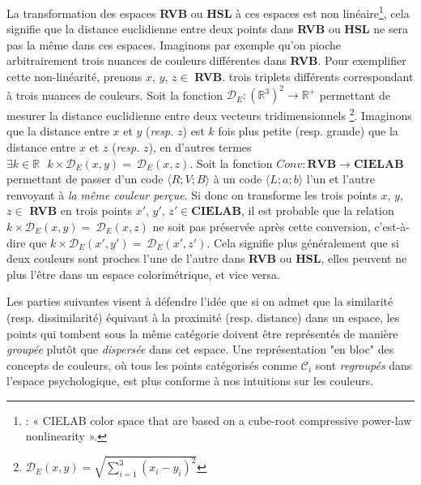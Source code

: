\documentclass{article}
\begin{document}
La transformation des espaces \textbf{RVB} ou \textbf{HSL} à ces espaces est non linéaire\footnote{\textcite[p.43]{fairchild2013}: « CIELAB color space that are based on a cube-root compressive power-law nonlinearity ».}, cela signifie que la distance euclidienne entre deux points dans \textbf{RVB} ou \textbf{HSL} ne sera pas la même dans ces espaces. Imaginons par exemple qu’on pioche arbitrairement trois nuances de couleurs différentes dans \textbf{RVB}. Pour exemplifier cette non-linéarité, prenons $x$, $y$, $z \in$ \textbf{RVB}. trois triplets différents correspondant à trois nuances de couleurs.  Soit la fonction \(\mathcal{D}_E\colon\left(\mathbb{R}^3\right)^2\rightarrow\mathbb{R}^+\) permettant de mesurer la distance euclidienne entre deux vecteurs tridimensionnels \footnote{$\mathcal{D}_E(x,y)=\sqrt{\sum_{i=1}^{3}\left(x_i - y_i \right)^2}$}. Imaginons que la distance entre $x$ et $y$ (\textit{resp.} $z$) est $k$ fois plus petite (resp. grande) que la distance entre $x$ et $z$ (\textit{resp.} $z$), en d’autres termes $\exists k\in\mathbb{R}\ \ \ k\times\mathcal{D}_E\left(x,y\right)=\ \mathcal{D}_E\left(x,z\right)$. Soit la fonction $Conv : \textbf{RVB} \rightarrow \textbf{CIELAB}$ permettant de passer d'un code $\langle R ; V ; B \rangle$ à un code $\langle L ;a ; b\rangle$ l’un et l’autre renvoyant à \textit{la même couleur perçue}. Si donc on transforme les trois points $x$, $y$, $z \in$ \textbf{RVB} en trois points $x'$, $y'$, $z' \in \textbf{CIELAB}$, il est probable que la relation $k\times\mathcal{D}_E\left(x,y\right)=\ \mathcal{D}_E\left(x,z\right)$ ne soit pas préservée après cette conversion, c’est-à-dire que $k\times\mathcal{D}_E\left(x\prime,y\prime\right)=\ \mathcal{D}_E\left(x\prime,z\prime\right)$. Cela signifie plus généralement que si deux couleurs sont proches l'une de l'autre dans \textbf{RVB} ou  \textbf{HSL}, elles peuvent ne plus l'être dans un espace colorimétrique, et vice versa.
\par
Les parties suivantes visent à défendre l’idée que si on admet que la similarité (resp. dissimilarité) équivaut à la proximité (resp. distance) dans un espace, les points qui tombent sous la même catégorie doivent être représentés de manière \textit{groupée} plutôt que \textit{dispersée} dans cet espace. Une représentation "en bloc" des concepts de couleurs, où tous les points catégorisés comme $\mathcal{C}_i$ sont \textit{regroupés} dans l'espace psychologique, est plus conforme à nos intuitions sur les couleurs.
\end{document}
